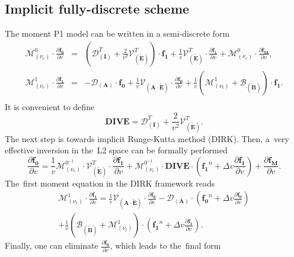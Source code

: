 \documentclass[preprint,12pt]{elsarticle}
\newcommand{\pdv}[2]{\frac{\partial{#1}}{\partial{#2}}}
\newcommand{\vect}[1]{\boldsymbol{#1}}
\newcommand{\matr}[1]{\mathbf{#1}}
\newcommand{\nue}{\nu_{e}}
\newcommand{\nutot}{\nu_{t}}
\newcommand{\vmag}{v}
\newcommand{\tE}{\vect{\tilde{E}}}
\newcommand{\tB}{\vect{\tilde{B}}}
\newcommand{\fM}{f_M}
\newcommand{\vfzero}{\vect{f_0}}
\newcommand{\fone}{\vect{f_1}}
\newcommand{\MI}{\matr{I}}
\newcommand{\MA}{\matr{A}}
\newcommand{\IM}{\boldsymbol{\mathcal{M}}}
\newcommand{\ID}{\boldsymbol{\mathcal{D}}}
\newcommand{\IV}{\boldsymbol{\mathcal{V}}}
\newcommand{\IB}{\boldsymbol{\mathcal{B}}}
\begin{document}
\subsection{Implicit fully-discrete scheme}\label{sec:impl_fullydiscrete_scheme}
The moment P1 model can be written in a semi-discrete form
\begin{eqnarray}
  \IM^0_{(\nue)} \cdot \pdv{\vfzero}{\vmag}  
  &=& 
  \left(\ID^T_{\left(\MI\right)}
  + \frac{2}{\vmag^2}\IV^T_{\left(\tE\right)}\right) \cdot \fone
  + \frac{1}{\vmag}\IV^T_{\left(\tE\right)} \cdot 
  \pdv{\fone}{\vmag} 
  + \IM^0_{(\nue)} \cdot \pdv{\vect{\fM}}{\vmag},  
  \nonumber \label{eq:semiM1hosf0} \\
  \IM^1_{(\nue)} \cdot \pdv{\fone}{\vmag}  
  &=& 
  - \ID_{\left(\MA\right)}\cdot \vfzero
  + \frac{1}{\vmag}\IV_{\left(\MA \cdot \tE\right)} \cdot
  \pdv{\vfzero}{\vmag}
  + \frac{1}{\vmag}\left(
  \IM^1_{\left( \nutot \right)} + \IB_{\left( \tB \right)}  
  \right) \cdot \fone.
  \nonumber\\
  \label{eq:semiM1hosf1}
\end{eqnarray}
It is convenient to define
\begin{equation}
  \matr{DIVE} = \ID^T_{\left(\MI\right)} 
  + \frac{2}{\vmag^2}\IV^T_{\left(\tE\right)}.
  \nonumber
\end{equation}
The next step is towards implicit Runge-Kutta method (DIRK).
Then, a~very effective inversion in the~L2 space can be formally performed
\begin{equation}
  \pdv{\vfzero}{\vmag}  
  = \frac{1}{\vmag}
  \IM^{0^{-1}}_{(\nue)} \cdot \IV^T_{\left(\tE\right)} \cdot 
  \pdv{\fone}{\vmag} 
  + \IM^{0^{-1}}_{(\nue)} \cdot \matr{DIVE}\cdot  
  \left(\fone^n 
  + \Delta\vmag\pdv{\fone}{\vmag}\right) 
  + \pdv{\vect{\fM}}{\vmag}.
  \label{eq:fullP1hosf0}
\end{equation}
The~first moment equation in the DIRK framework reads
\begin{multline}
  \IM^1_{(\nue)} \cdot \pdv{\fone}{\vmag}  
  = \frac{1}{\vmag}\IV_{\left(\MA \cdot \tE\right)} \cdot
  \pdv{\vfzero}{\vmag}
  - \ID_{\left(\MA\right)}\cdot \left(\vfzero^n 
  + \Delta\vmag\pdv{\vfzero}{\vmag}\right)\\ 
  + \frac{1}{\vmag}\left(\IB_{\left( \tB \right)} 
  + \IM^1_{\left( \nutot \right)}\right) 
  \cdot \left(\fone^n 
  + \Delta\vmag\pdv{\fone}{\vmag}\right).
  \label{eq:semiM1hosf1}
\end{multline}
Finally, one can eliminate $\pdv{\vfzero}{\vmag}$, 
which leads to the~final form
\end{document}
